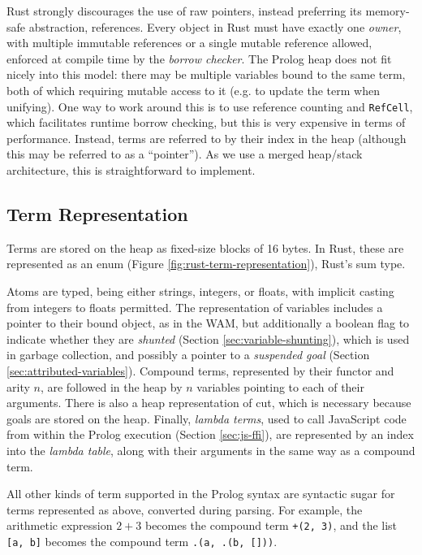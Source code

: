 Rust strongly discourages the use of raw pointers, instead preferring its memory-safe abstraction, references. Every object in Rust must have exactly one \emph{owner}, with multiple immutable references or a single mutable reference allowed, enforced at compile time by the \emph{borrow checker}. The Prolog heap does not fit nicely into this model: there may be multiple variables bound to the same term, both of which requiring mutable access to it (e.g. to update the term when unifying). One way to work around this is to use reference counting and \texttt{RefCell}, which facilitates runtime borrow checking, but this is very expensive in terms of performance. Instead, terms are referred to by their index in the heap (although this may be referred to as a ``pointer''). As we use a merged heap/stack architecture, this is straightforward to implement.

\subsection{Term Representation}

\label{sec:term-representation}

Terms are stored on the heap as fixed-size blocks of 16 bytes. In Rust, these are represented as an enum (Figure \ref{fig:rust-term-representation}), Rust's sum type.

Atoms are typed, being either strings, integers, or floats, with implicit casting from integers to floats permitted. The representation of variables includes a pointer to their bound object, as in the WAM, but additionally a boolean flag to indicate whether they are \emph{shunted} (Section \ref{sec:variable-shunting}), which is used in garbage collection, and possibly a pointer to a \emph{suspended goal} (Section \ref{sec:attributed-variables}). Compound terms, represented by their functor and arity $n$, are followed in the heap by $n$ variables pointing to each of their arguments. There is also a heap representation of cut, which is necessary because goals are stored on the heap. Finally, \emph{lambda terms}, used to call JavaScript code from within the Prolog execution (Section \ref{sec:js-ffi}), are represented by an index into the \emph{lambda table}, along with their arguments in the same way as a compound term.

All other kinds of term supported in the Prolog syntax are syntactic sugar for terms represented as above, converted during parsing. For example, the arithmetic expression $2 + 3$ becomes the compound term \texttt{+(2, 3)}, and the list \texttt{[a, b]} becomes the compound term \texttt{.(a, .(b, []))}.

